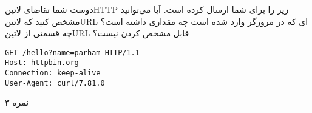 \documentclass[../main.tex]{subfiles}
\begin{document}

دوست شما تقاضای ‌لاتین{HTTP} زیر را برای شما ارسال کرده است.
آیا می‌توانید مشخص کنید که ‌لاتین{URL} ای که در مرورگر وارد شده است چه مقداری داشته است؟
چه قسمتی از ‌لاتین{URL} قابل مشخص کردن نیست؟

\begin{latin}
\begin{verbatim}
GET /hello?name=parham HTTP/1.1
Host: httpbin.org
Connection: keep-alive
User-Agent: curl/7.81.0
\end{verbatim}
\end{latin}

۳ نمره
\end{document}
